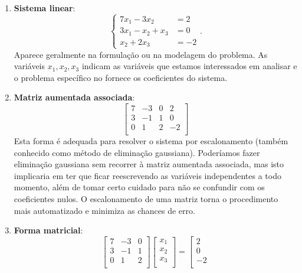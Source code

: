 \documentclass[../livro.tex]{subfiles}  %
\begin{document}
\begin{enumerate}[1.]
	\item \textbf{Sistema linear}:
	\begin{equation}
	\left\{
	\begin{array}{rl}
	7x_1 - 3x_2 & = 2 \\
	3x_1 - x_2 + x_3 & = 0 \\
	x_2 + 2x_3 & = -2
	\end{array}
	\right..
	\end{equation} Aparece geralmente na formulação ou na modelagem do problema. As variáveis $x_1, x_2, x_3$ indicam as variáveis que estamos interessados em analisar e o problema específico no fornece os coeficientes do sistema.
	\item \textbf{Matriz aumentada associada}:
	\begin{equation}
	\left[
	\begin{array}{ccc|c}
	7 & -3 & 0 & 2 \\
	3 & -1 & 1 & 0 \\
	0 & 1 & 2 & -2 \\
	\end{array}
	\right]
	\end{equation} Esta forma é adequada para resolver o sistema por escalonamento (também conhecido como método de eliminação gaussiana). Poderíamos fazer eliminação gaussiana sem recorrer à matriz aumentada associada, mas isto implicaria em ter que ficar reescrevendo as variáveis independentes a todo momento, além de tomar certo cuidado para não se confundir com os coeficientes nulos. O escalonamento de uma matriz torna o procedimento mais automatizado e minimiza as chances de erro.
	\item  \textbf{Forma matricial}:
	\begin{equation}
	\left[
	\begin{array}{ccc}
	7 & -3 & 0  \\
	3 & -1 & 1  \\
	0 & 1 & 2  \\
	\end{array}
	\right]
	\left[
	\begin{array}{c}
	x_1   \\
	x_2   \\
	x_3   \\
	\end{array}
	\right] =
	\left[
	\begin{array}{c}
	2   \\
	0   \\
	-2  \\

\end{array}
\end{equation}
\end{enumerate}
\end{document}
